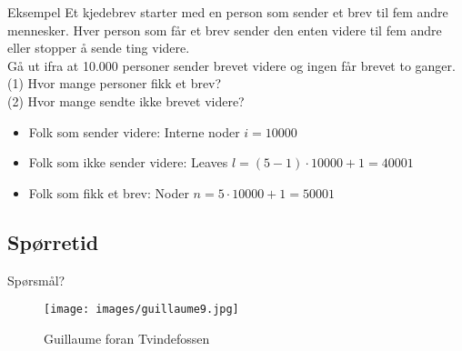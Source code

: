 \begin{frame}{Eksempel}
Et kjedebrev starter med en person som sender et brev til fem andre mennesker. Hver person som får et brev sender den enten videre til fem andre eller stopper å sende ting videre.\\
Gå ut ifra at 10.000 personer sender brevet videre og ingen får brevet to ganger.\\
(1) Hvor mange personer fikk et brev?\\
(2) Hvor mange sendte ikke brevet videre?\\\pause
\begin{itemize}
\item Folk som sender videre: Interne noder $i=10000$
\item Folk som ikke sender videre: Leaves $l = (5-1)\cdot 10000 + 1 = 40001$
\item Folk som fikk et brev: Noder $n=5\cdot 10000 + 1 = 50001$
\end{itemize}
\end{frame}

\subsection*{Spørretid}
\begin{frame}{Spørsmål?}
    \begin{figure}
        \centering
        \texttt{[image: images/guillaume9.jpg]}
        \caption{Guillaume foran Tvindefossen}
        \label{fig:guillaume9}
    \end{figure}
\end{frame}
